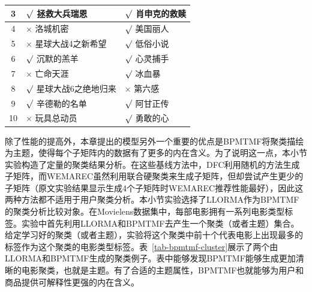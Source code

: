\begin{table}
{\begin{tabular}{|c||p{6cm}|p{6cm}|}
		\hline
		         3 &  $\surd$   拯救大兵瑞恩 &  $\surd$   肖申克的救赎 \bigstrut\\
		\hline
		         4 &     $\times$      洛城机密 &   $\surd$    美国丽人 \bigstrut\\
		\hline
		         5 &  $\times$    星球大战4之新希望 &  $\surd$     低俗小说 \bigstrut\\
		\hline
		         6 & $\surd$     沉默的羔羊 &   $\surd$    心灵捕手 \bigstrut\\
		\hline
		         7 &    $\times$       亡命天涯 &   $\surd$     冰血暴 \bigstrut\\
		\hline
		         8 & $\surd$ 星球大战6之绝地归来 &   $\times$         第六感 \bigstrut\\
		\hline
		         9 &   $\surd$  辛德勒的名单 & $\surd$      阿甘正传 \bigstrut\\
		\hline
		        10 &  $\times$        玩具总动员 &   $\surd$    勇敢的心 \bigstrut\\
		\hline
	\end{tabular}
	}
	
\end{table}%

除了性能的提高外，本章提出的模型另外一个重要的优点是BPMTMF将聚类描绘为主题，使得每个子矩阵内的数据有了更多的内在含义。为了说明这一点，本小节实验构造了定量的聚类结果分析。在这些基线方法中，DFC利用随机的方法生成子矩阵，而WEMAREC虽然利用联合硬聚类来生成子矩阵，但却尝试产生更少的子矩阵（原文实验结果显示生成4个子矩阵时WEMAREC推荐性能最好），因此这两种方法都不适用于用户聚类分析。本小节实验选择了LLORMA作为BPMTMF的聚类分析比较对象。在Movielens数据集中，每部电影拥有一系列电影类型标签。实验中首先利用LLORMA和BPMTMF去产生一个聚类（或者主题）集合。给定学习好的聚类（或者主题），实验将这个聚类中前十个代表电影上出现最多的标签作为这个聚类的电影类型标签。表~\ref{tab-bpmtmf-cluster}展示了两个由LLORMA和BPMTMF生成的聚类例子。表中能够发现BPMTMF能够生成更加清晰的电影聚类，也就是主题。有了合适的主题属性，BPMTMF也就能够为用户和商品提供可解释性更强的内在含义。

